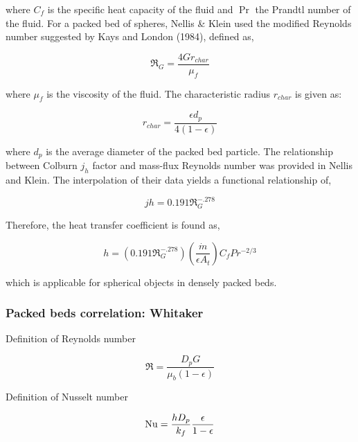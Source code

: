 where $C_f$ is the specific heat capacity of the fluid and $\Pr$ the Prandtl number of the fluid. For a packed bed of spheres, Nellis \& Klein used the modified Reynolds number suggested by Kays and London (1984), defined as,

\begin{equation}
	\Re_G=\frac{4 G r_{char}}{\mu_f}
\end{equation}

where $\mu_f$ is the viscosity of the fluid.  The characteristic radius $r_{char}$ is given as:

\begin{equation}
	r_{char}=\frac{\epsilon d_p}{4(1-\epsilon)}
\end{equation}

where $d_p$ is the average diameter of the packed bed particle. The relationship between Colburn $j_h$ factor and mass-flux Reynolds number was provided in Nellis and Klein. The interpolation of their data yields a functional relationship of,

\begin{equation}
	jh=0.191 \Re_G^{-.278}
\end{equation}

Therefore, the heat transfer coefficient is found as,

\begin{equation}
	h=(0.191 \Re_G^{-.278}) (\frac{\dot{m}}{\epsilon A_t}) C_f Pr^{-2/3}
\end{equation}

which is applicable for spherical objects in densely packed beds.





\subsubsection{Packed beds correlation: Whitaker}

Definition of Reynolds number

\begin{equation}
	\Re = \frac{D_p G}{\mu_b(1-\epsilon)}
\end{equation}

Definition of Nusselt number

\begin{equation}
	\mathrm{Nu} = \frac{hD_p}{k_f}\frac{\epsilon}{1-\epsilon}
\end{equation}


